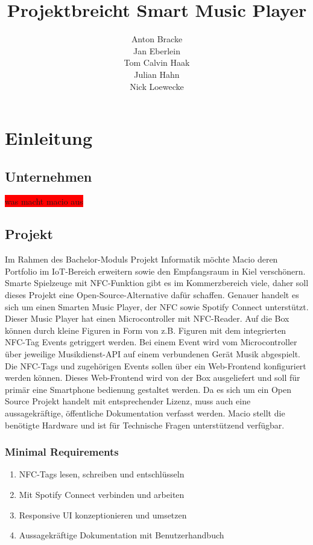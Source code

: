 \documentclass[10pt, a4paper, draft]{article}
\title{Projektbreicht Smart Music Player}
\author{Anton Bracke\\Jan Eberlein\\Tom Calvin Haak\\Julian Hahn\\Nick Loewecke}
\begin{document}
\maketitle
\tableofcontents

\section{Einleitung}
\subsection{Unternehmen}
\colorbox{red}{was macht macio aus}
\subsection{Projekt}
Im Rahmen des Bachelor-Moduls Projekt Informatik möchte Macio deren Portfolio im IoT-Bereich erweitern sowie den Empfangsraum in Kiel verschönern.
Smarte Spielzeuge mit NFC-Funktion gibt es im Kommerzbereich viele, daher soll dieses Projekt eine Open-Source-Alternative dafür schaffen.
Genauer handelt es sich um einen Smarten Music Player, der NFC sowie Spotify Connect unterstützt.
Dieser Music Player hat einen Microcontroller mit NFC-Reader.
Auf die Box können durch kleine Figuren in Form von z.B. Figuren mit dem integrierten NFC-Tag Events getriggert werden.
Bei einem Event wird vom Microcontroller über jeweilige Musikdienst-API auf einem verbundenen Gerät Musik abgespielt.
Die NFC-Tags und zugehörigen Events sollen über ein Web-Frontend konfiguriert werden können.
Dieses Web-Frontend wird von der Box ausgeliefert und soll für primär eine Smartphone bedienung gestaltet werden.
Da es sich um ein Open Source Projekt handelt mit entsprechender Lizenz, muss auch eine aussagekräftige, öffentliche Dokumentation verfasst werden.
Macio stellt die benötigte Hardware und ist für Technische Fragen unterstützend verfügbar.

\subsubsection{Minimal Requirements}
\begin{enumerate}
  \item NFC-Tags lesen, schreiben und entschlüsseln
  \item Mit Spotify Connect verbinden und arbeiten
  \item Responsive UI konzeptionieren und umsetzen
  \item Aussagekräftige Dokumentation mit Benutzerhandbuch
\end{enumerate}
\end{document}
